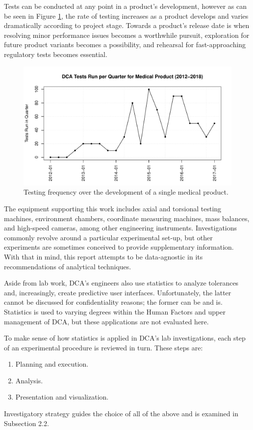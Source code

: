 \documentclass[11pt,a4paper,article]{memoir} %
\begin{document}
Tests can be conducted at any point in a product's development, however as can be seen in Figure \ref{fig:tests_per_quarter}, the rate of testing increases as a product develops and varies dramatically according to project stage. Towards a product's release date is when resolving minor performance issues becomes a worthwhile pursuit, exploration for future product variants becomes a possibility, and rehearsal for fast-approaching regulatory tests becomes essential.
\begin{figure}
\includegraphics[width=\textwidth]{tests_per_quarter.pdf}
\caption{Testing frequency over the development of a single medical product.}
\label{fig:tests_per_quarter}
\end{figure}
\par
The equipment supporting this work includes axial and torsional testing machines, environment chambers, coordinate measuring machines, mass balances, and high-speed cameras, among other engineering instruments. Investigations commonly revolve around a particular experimental set-up, but other experiments are sometimes conceived to provide supplementary information. With that in mind, this report attempts to be data-agnostic in its recommendations of analytical techniques.
\par
Aside from lab work, DCA's engineers also use statistics to analyze tolerances and, increasingly, create predictive user interfaces. Unfortunately, the latter cannot be discussed for confidentiality reasons; the former can be and is. Statistics is used to varying degrees within the Human Factors and upper management of DCA, but these applications are not evaluated here.
\par
To make sense of how statistics is applied in DCA's lab investigations, each step of an experimental procedure is reviewed in turn. These steps are:
\begin{enumerate}
\item Planning and execution.
\item Analysis.
\item Presentation and visualization.
\end{enumerate}
Investigatory strategy guides the choice of all of the above and is examined in Subsection 2.2.
\newpage
\end{document}
